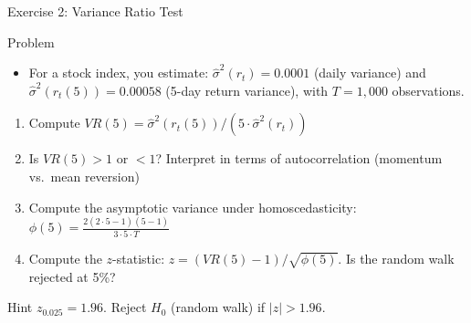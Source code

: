 \documentclass[9pt, aspectratio=169, t]{beamer}
\theoremstyle{definition}
\newenvironment{cminipage}[1]{%
    \par\noindent\hfill\begin{minipage}{#1}\ignorespaces
}{%
    \end{minipage}\hfill\null\par
}
\begin{document}
\begin{frame}{Exercise 2: Variance Ratio Test}
\begin{cminipage}{0.95\textwidth}
\begin{block}{Problem}
\begin{itemize}
\item For a stock index, you estimate: $\hat{\sigma}^2(r_t) = 0.0001$ (daily variance) and $\hat{\sigma}^2(r_t(5)) = 0.00058$ (5-day return variance), with $T = 1{,}000$ observations.
\end{itemize}
\end{block}
\begin{enumerate}
    \item Compute $VR(5) = \hat{\sigma}^2(r_t(5)) / (5 \cdot \hat{\sigma}^2(r_t))$
    \item Is $VR(5) > 1$ or $< 1$? Interpret in terms of autocorrelation (momentum vs.\ mean reversion)
    \item Compute the asymptotic variance under homoscedasticity: $\phi(5) = \frac{2(2 \cdot 5 - 1)(5 - 1)}{3 \cdot 5 \cdot T}$
    \item Compute the $z$-statistic: $z = (VR(5) - 1)/\sqrt{\phi(5)}$. Is the random walk rejected at 5\%?
\end{enumerate}
\vspace{0.1cm}
\begin{exampleblock}{Hint}
$z_{0.025} = 1.96$. Reject $H_0$ (random walk) if $|z| > 1.96$.
\end{exampleblock}
\end{cminipage}
\end{frame}
\end{document}
